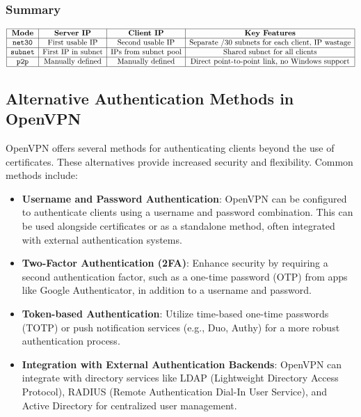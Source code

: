 \subsubsection{Summary}
\[
\begin{array}{|c|c|c|c|}
\hline
\textbf{Mode} & \textbf{Server IP} & \textbf{Client IP} & \textbf{Key Features} \\
\hline
\texttt{net30} & \text{First usable IP} & \text{Second usable IP} & \text{Separate /30 subnets for each client, IP wastage} \\
\hline
\texttt{subnet} & \text{First IP in subnet} & \text{IPs from subnet pool} & \text{Shared subnet for all clients} \\
\hline
\texttt{p2p} & \text{Manually defined} & \text{Manually defined} & \text{Direct point-to-point link, no Windows support} \\
\hline
\end{array}
\]

\subsection{Alternative Authentication Methods in OpenVPN}

OpenVPN offers several methods for authenticating clients beyond the use of certificates. These alternatives provide increased security and flexibility. Common methods include:

\begin{itemize}
\item \textbf{Username and Password Authentication}: OpenVPN can be configured to authenticate clients using a username and password combination. This can be used alongside certificates or as a standalone method, often integrated with external authentication systems.
\item \textbf{Two-Factor Authentication (2FA)}: Enhance security by requiring a second authentication factor, such as a one-time password (OTP) from apps like Google Authenticator, in addition to a username and password.
\item \textbf{Token-based Authentication}: Utilize time-based one-time passwords (TOTP) or push notification services (e.g., Duo, Authy) for a more robust authentication process.
\item \textbf{Integration with External Authentication Backends}: OpenVPN can integrate with directory services like LDAP (Lightweight Directory Access Protocol), RADIUS (Remote Authentication Dial-In User Service), and Active Directory for centralized user management.
\end{itemize}

